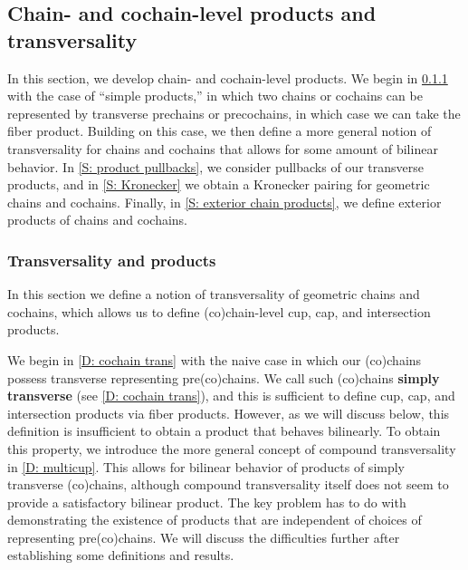 \subsection{Chain- and cochain-level products and transversality}\label{S: chain products}

In this section, we develop chain- and cochain-level products.
We begin in \cref{S: simple products} with the case of ``simple products,'' in which two chains or cochains can be represented by transverse prechains or precochains, in which case we can take the fiber product.
Building on this case, we then define a more general notion of transversality for chains and cochains that allows for some amount of bilinear behavior.
In \cref{S: product pullbacks}, we consider pullbacks of our transverse products, and in \cref{S: Kronecker} we obtain a Kronecker pairing for geometric chains and cochains.
Finally, in \cref{S: exterior chain products}, we define exterior products of chains and cochains.


\subsubsection{Transversality and products}\label{S: simple products}
In this section we define a notion of transversality of geometric chains and cochains, which allows us to define (co)chain-level cup, cap, and intersection products.

We begin in \cref{D: cochain trans} with the naive case in which our (co)chains possess transverse representing pre(co)chains.
We call such (co)chains \textbf{simply transverse} (see \cref{D: cochain trans}), and this is sufficient to define cup, cap, and intersection products via fiber products.
However, as we will discuss below, this definition is insufficient to obtain a product that behaves bilinearly.
To obtain this property, we introduce the more general concept of compound transversality in \cref{D: multicup}.
This allows for bilinear behavior of products of simply transverse (co)chains, although compound transversality itself does not seem to provide a satisfactory bilinear product.
The key problem has to do with demonstrating the existence of products that are independent of choices of representing pre(co)chains.
We will discuss the difficulties further after establishing some definitions and results.

\begin{comment}
	For example, one might consider the case where $\uV$ and $\uW$ can be represented by disjoint unions of pre(co)chains $V = \bigsqcup V_i$ and $W = \bigsqcup W_j$ such that the pairs $(V_i,W_j)$ are not necessarily transverse but such that for each such pair there are alternative representatives, say $(V'_{ij},W'_{ji})$, depending on both $i$ and $j$, with $\underline{V_i} = \underline{V'_{ij}}$, $\underline{W_j} = \underline{W'_{ji}}$, and $V'_{ij}$ transverse to $W'_{ji}$.
	Then one would like to have products of $\uV$ and $\uW$ using these representatives.
\end{comment}


